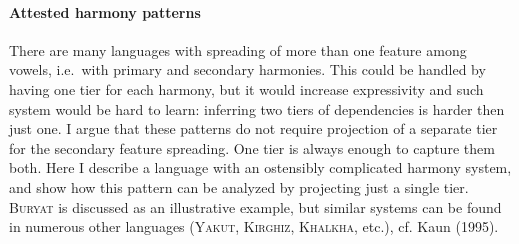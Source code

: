 \documentclass[a4paper,12pt]{article}
\begin{document}
\paragraph{Attested harmony patterns}
There are many languages with spreading of more than one feature among vowels, i.e.\ with primary and secondary harmonies.
This could be handled by having one tier for each harmony, but it would increase expressivity and such system would be hard to learn: inferring two tiers of dependencies is harder then just one.
I argue that these patterns do not require projection of a separate tier for the secondary feature spreading.
One tier is always enough to capture them both.
Here I describe a language with an ostensibly complicated harmony system, and show how this pattern can be analyzed by projecting just a single tier.
\textsc{Buryat} is discussed as an illustrative example, but similar systems can be found in numerous other languages (\textsc{Yakut}, \textsc{Kirghiz}, \textsc{Khalkha}, etc.), cf. Kaun (1995).
\smallskip
\end{document}
